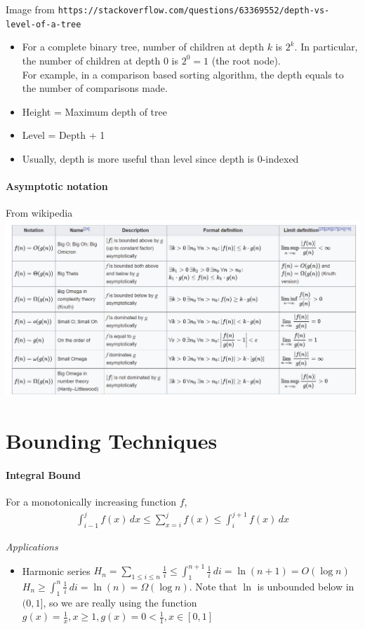 \documentclass{article}
\begin{document}
Image from \texttt{https://stackoverflow.com/questions/63369552/depth-vs-level-of-a-tree}
\begin{itemize}
	\item For a complete binary tree, number of children at depth $k$ is $2^k$. In particular, the number of children at depth $0$ is $2^0=1$ (the root node).\\
	For example, in a comparison based sorting algorithm, the depth equals to the number of comparisons made.
	\item Height = Maximum depth of tree
	\item Level = Depth + 1
	\item Usually, depth is more useful than level since depth is $0$-indexed
\end{itemize}

\paragraph{Asymptotic notation} From wikipedia\\
\includegraphics[scale=0.5]{asymptotic_notation.png}

\section{Bounding Techniques}
\paragraph{Integral Bound}
For a monotonically increasing function $f$,
\begin{align*}
	\int_{i-1}^j f(x)\,dx \leq \sum_{x=i}^jf(x)\leq \int_i^{j+1}f(x)\,dx
\end{align*}

\textit{Applications}
\begin{itemize}
	\item Harmonic series $H_n=\sum_{1\leq i\leq n}\frac{1}{i}\leq \int_1^{n+1}\frac{1}{i}\,di=\ln(n+1)=O(\log n)$\\
	$H_n\geq \int_1^{n}\frac{1}{i}\,di=\ln(n)=\Omega(\log n)$. Note that $\ln$ is unbounded below in $(0,1]$, so we are really using the function $g(x) = \frac{1}{x}, x\geq 1, g(x) = 0 < \frac{1}{1}, x \in [0,1]$
\end{itemize}
\end{document}
